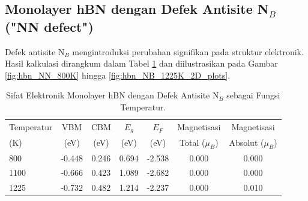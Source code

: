 \subsection{Monolayer hBN dengan Defek Antisite N$_B$ ("NN defect")}
\label{subsec:hbn_defek_nb}
Defek antisite N$_B$ mengintroduksi perubahan signifikan pada struktur elektronik. Hasil kalkulasi dirangkum dalam Tabel \ref{tab:hbn_defek_nb} dan diilustrasikan pada Gambar \ref{fig:hbn_NN_800K} hingga \ref{fig:hbn_NB_1225K_2D_plots}.

\begin{table}[h!]
  \centering
  \caption{Sifat Elektronik Monolayer hBN dengan Defek Antisite N$_B$ sebagai Fungsi Temperatur.}
  \label{tab:hbn_defek_nb}
  \begin{tabular}{lcccccc}
    \toprule
    Temperatur & VBM & CBM & $E_g$ & $E_F$ & Magnetisasi & Magnetisasi \\
    (K) & (eV) & (eV) & (eV) & (eV) & Total ($\mu_B$) & Absolut ($\mu_B$) \\
    \midrule
    800  & -0.448 &  0.246 & 0.694 & -2.538 & 0.000 & 0.000 \\
    1100 & -0.666 &  0.423 & 1.089 & -2.682 & 0.000 & 0.000 \\
    1225 & -0.732 &  0.482 & 1.214 & -2.237 & 0.000 & 0.010 \\
    \bottomrule
  \end{tabular}
\end{table}


